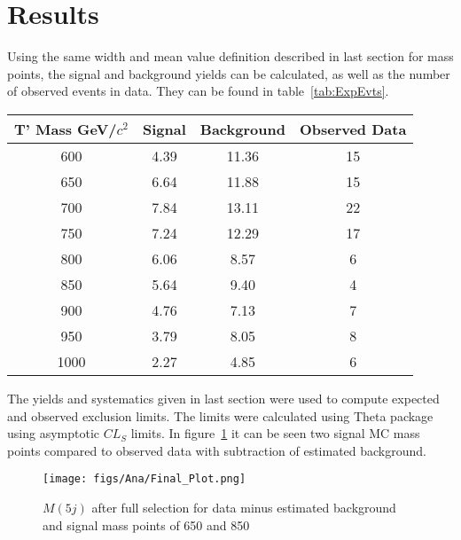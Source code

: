 \section{Results}
\label{sec:res}

Using the same width and mean value definition described in last section for mass points, the signal and background yields can be calculated, as well as the number of observed events in data. They can be found in table~\ref{tab:ExpEvts}. 

\begin{table*}[htbH]
\begin{center}
\begin{tabular}{|c|c|c|c|}
\hline 
T' Mass GeV/$c^{2}$ & Signal & Background & Observed Data\\
\hline 
600 & 4.39 & 11.36 & 15 \\
650 & 6.64 & 11.88 & 15 \\
700 & 7.84 & 13.11 & 22 \\
750 & 7.24 & 12.29 & 17 \\
800 & 6.06 & 8.57 & 6 \\
850 & 5.64 & 9.40 & 4 \\
900 & 4.76 & 7.13 & 7 \\
950 & 3.79 & 8.05 & 8 \\
1000 & 2.27 & 4.85 & 6 \\
\hline
\end{tabular}
\caption{Expected number of events for the signal, estimated background and observed data after full selection \label{tab:ExpEvts}}
\end{center}
\end{table*}

The yields and systematics given in last section were used to compute expected and observed exclusion limits. The limits were calculated using Theta package~\cite{theta_web} using asymptotic $CL_{S}$ limits. In figure~\ref{fig:FinalPlot} it can be seen two signal MC mass points compared to observed data with subtraction of estimated background.

\begin{figure}[!Hhtbp]
  \begin{center}
    \texttt{[image: figs/Ana/Final\_Plot.png]}
    \caption{$M(5j)$ after full selection for data minus estimated background and signal mass points of 650 \GeVcc and 850 \GeVcc}
    \label{fig:FinalPlot}
  \end{center}
\end{figure}

